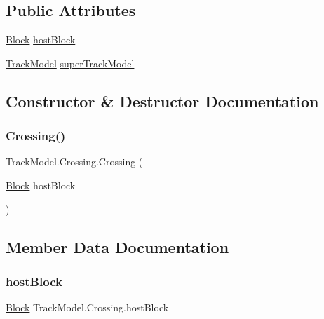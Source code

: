 \subsection*{Public Attributes}
\begin{DoxyCompactItemize}
\item 
\hyperlink{classTrackModel_1_1Block}{Block} \hyperlink{classTrackModel_1_1Crossing_a1e9bc8acd2681fa0c85cf43cfec99368}{host\+Block}
\item 
\hyperlink{classTrackModel_1_1TrackModel}{Track\+Model} \hyperlink{classTrackModel_1_1Crossing_af353edaf8c1d5f5cad24ffc45f3370e4}{super\+Track\+Model}
\end{DoxyCompactItemize}


\subsection{Constructor \& Destructor Documentation}
\mbox{\label{classTrackModel_1_1Crossing_ab23fc0855d053936d68d367ce898d152}} 
\subsubsection{\texorpdfstring{Crossing()}{Crossing()}}
{\footnotesize\ttfamily Track\+Model.\+Crossing.\+Crossing (\begin{DoxyParamCaption}\item[{\hyperlink{classTrackModel_1_1Block}{Block}}]{host\+Block }\end{DoxyParamCaption})}



\subsection{Member Data Documentation}
\mbox{\label{classTrackModel_1_1Crossing_a1e9bc8acd2681fa0c85cf43cfec99368}} 
\subsubsection{\texorpdfstring{host\+Block}{hostBlock}}
{\footnotesize\ttfamily \hyperlink{classTrackModel_1_1Block}{Block} Track\+Model.\+Crossing.\+host\+Block}

